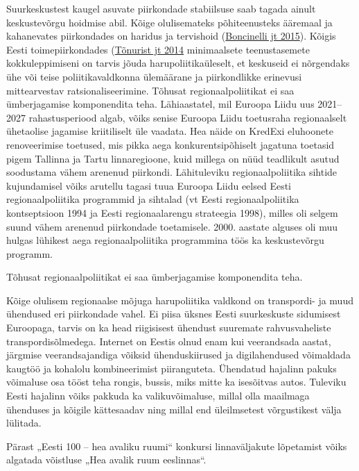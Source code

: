 \documentclass[estonian,]{article}
\begin{document}
Suurkeskustest kaugel asuvate piirkondade stabiilsuse saab tagada ainult keskustevõrgu hoidmise abil. Kõige olulisemateks põhiteenusteks ääremaal ja kahanevates piirkondades on haridus ja tervishoid (\protect\hyperlink{Boncinelli2015}{Boncinelli jt 2015}). Kõigis Eesti toimepiirkondades (\protect\hyperlink{Tuxf5nurist2014}{Tõnurist jt 2014} minimaalsete teenustasemete kokkuleppimiseni on tarvis jõuda harupoliitikaüleselt, et keskuseid ei nõrgendaks ühe või teise poliitikavaldkonna ülemäärane ja piirkondlikke erinevusi mittearvestav ratsionaliseerimine. Tõhusat regionaalpoliitikat ei saa ümberjagamise komponendita teha. Lähiaastatel, mil Euroopa Liidu uus 2021--2027 rahastusperiood algab, võiks senise Euroopa Liidu toetusraha regionaalselt ühetaolise jagamise kriitiliselt üle vaadata. Hea näide on KredExi eluhoonete renoveerimise toetused, mis pikka aega konkurentsipõhiselt jagatuna toetasid pigem Tallinna ja Tartu linnaregioone, kuid millega on nüüd teadlikult asutud soodustama vähem arenenud piirkondi. Lähituleviku regionaalpoliitika sihtide kujundamisel võiks arutellu tagasi tuua Euroopa Liidu eelsed Eesti regionaalpoliitika programmid ja sihtalad (vt Eesti regionaalpoliitika kontseptsioon 1994 ja Eesti regionaalarengu strateegia 1998), milles oli selgem suund vähem arenenud piirkondade toetamisele. 2000. aastate alguses oli muu hulgas lühikest aega regionaalpoliitika programmina töös ka keskustevõrgu programm.

\begin{blockquote-left}
Tõhusat regionaalpoliitikat ei saa ümberjagamise komponendita teha.
\end{blockquote-left}

Kõige olulisem regionaalse mõjuga harupoliitika valdkond on transpordi- ja muud ühendused eri piirkondade vahel. Ei piisa üksnes Eesti suurkeskuste sidumisest Euroopaga, tarvis on ka head riigisisest ühendust suuremate rahvusvaheliste transpordisõlmedega. Internet on Eestis olnud enam kui veerandsada aastat, järgmise veerandsajandiga võiksid ühenduskiirused ja digilahendused võimaldada kaugtöö ja kohalolu kombineerimist piiranguteta. Ühendatud hajalinn pakuks võimaluse osa tööst teha rongis, bussis, miks mitte ka isesõitvas autos. Tuleviku Eesti hajalinn võiks pakkuda ka valikuvõimaluse, millal olla maailmaga ühenduses ja kõigile kättesaadav ning millal end üleilmsetest võrgustikest välja lülitada.

\begin{blockquote-right}
Pärast „Eesti 100 -- hea avaliku ruumi`` konkursi linnaväljakute
lõpetamist võiks algatada võistluse „Hea avalik ruum eeslinnas``.
\end{blockquote-right}
\end{document}
